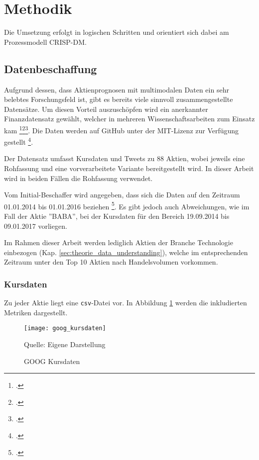 \newpage
\section{Methodik}
Die Umsetzung erfolgt in logischen Schritten und orientiert sich dabei am Prozessmodell \ac{CRISP-DM}.  

\subsection{Datenbeschaffung}\label{sec:data_ingestion}
Aufgrund dessen, dass Aktienprognosen mit multimodalen Daten ein sehr belebtes Forschungsfeld ist, gibt es bereits viele sinnvoll zusammengestellte Datensätze. Um diesen Vorteil auszuschöpfen wird ein anerkannter Finanzdatensatz gewählt, welcher in mehreren Wissenschaftsarbeiten zum Einsatz kam \footcite{xu2018StockMovement}\footcite{Xu2020StockMovement}\footcite{zhang2022transformer}. Die Daten werden auf GitHub unter der MIT-Lizenz zur Verfügung gestellt \footcite{website:stocknet-dataset}. 

Der Datensatz umfasst Kursdaten und Tweets zu 88 Aktien, wobei jeweils eine Rohfassung und eine vorverarbeitete Variante bereitgestellt wird. In dieser Arbeit wird in beiden Fällen die Rohfassung verwendet. 

Vom Initial-Beschaffer wird angegeben, dass sich die Daten auf den Zeitraum 01.01.2014 bis 01.01.2016 beziehen \footcite[Kap. 3]{xu2018StockMovement}.
Es gibt jedoch auch Abweichungen, wie im Fall der Aktie ''BABA'', bei der Kursdaten für den Bereich 19.09.2014 bis 09.01.2017 vorliegen.

Im Rahmen dieser Arbeit werden lediglich Aktien der Branche Technologie einbezogen (Kap. \ref{sec:theorie_data_understanding}), welche im entsprechenden Zeitraum unter den Top 10 Aktien nach Handelsvolumen vorkommen. 

\subsubsection*{Kursdaten}\label{sec:data_ingestion_stockdata}
Zu jeder Aktie liegt eine \texttt{csv}-Datei vor. In Abbildung \ref{fig:goog_kursdaten} werden die inkludierten Metriken dargestellt.
\newpage
\begin{figure}[H]
	\caption{GOOG Kursdaten}
	\texttt{[image: goog\_kursdaten]}
	\label{fig:goog_kursdaten}
	\raggedright
	\normalsize{Quelle: Eigene Darstellung}
	\vspace{-1.0em}
\end{figure}
 

